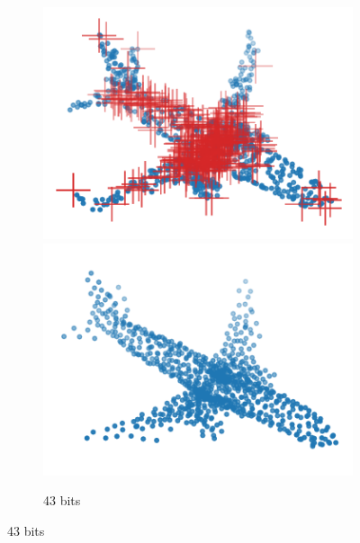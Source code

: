 \begin{figure}[t]
\begin{subfigure}[b]{\subfigureouterhspace}
    \begin{subsubfigure}[b]{\subfigurehspace}
      \centering
      \includegraphics[width=\linewidth]{img/point_cloud_compression/crit/test_airplane_0630/full_3.pdf}
      \includegraphics[width=\linewidth]{img/point_cloud_compression/rec/test_airplane_0630/full_3.pdf}
      \caption{43 bits}
      \label{fig:rec/full/3}
    \end{subsubfigure}%
    \hfill%
    \begin{subsubfigure}[b]{\subfigurehspace}
      \centering

\end{subsubfigure}
\end{subfigure}
\end{figure}
